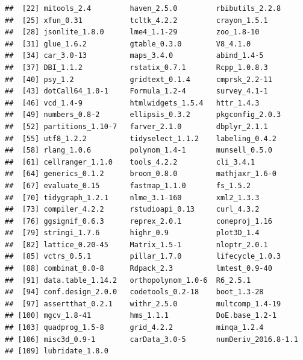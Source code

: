 \documentclass[11pt,a4paper,twoside]{book}\usepackage[]{graphicx}\usepackage[]{xcolor}
\makeatletter
\newenvironment{kframe}{%
 \def\at@end@of@kframe{}%
 \ifinner\ifhmode%
  \def\at@end@of@kframe{\end{minipage}}%
  \begin{minipage}{\columnwidth}%
 \fi\fi%
 \def\FrameCommand##1{\hskip\@totalleftmargin \hskip-\fboxsep
 \colorbox{shadecolor}{##1}\hskip-\fboxsep
     \hskip-\linewidth \hskip-\@totalleftmargin \hskip\columnwidth}%
 \MakeFramed {\advance\hsize-\width
   \@totalleftmargin\z@ \linewidth\hsize
   \@setminipage}}%
 {\par\unskip\endMakeFramed%
 \at@end@of@kframe}
\newenvironment{knitrout}{}{} %
\makeatother
\begin{document}
\begin{knitrout}
\begin{kframe}
\begin{verbatim}
##  [22] mitools_2.4         haven_2.5.0         rbibutils_2.2.8    
##  [25] xfun_0.31           tcltk_4.2.2         crayon_1.5.1       
##  [28] jsonlite_1.8.0      lme4_1.1-29         zoo_1.8-10         
##  [31] glue_1.6.2          gtable_0.3.0        V8_4.1.0           
##  [34] car_3.0-13          maps_3.4.0          abind_1.4-5        
##  [37] DBI_1.1.2           rstatix_0.7.1       Rcpp_1.0.8.3       
##  [40] psy_1.2             gridtext_0.1.4      cmprsk_2.2-11      
##  [43] dotCall64_1.0-1     Formula_1.2-4       survey_4.1-1       
##  [46] vcd_1.4-9           htmlwidgets_1.5.4   httr_1.4.3         
##  [49] numbers_0.8-2       ellipsis_0.3.2      pkgconfig_2.0.3    
##  [52] partitions_1.10-7   farver_2.1.0        dbplyr_2.1.1       
##  [55] utf8_1.2.2          tidyselect_1.1.2    labeling_0.4.2     
##  [58] rlang_1.0.6         polynom_1.4-1       munsell_0.5.0      
##  [61] cellranger_1.1.0    tools_4.2.2         cli_3.4.1          
##  [64] generics_0.1.2      broom_0.8.0         mathjaxr_1.6-0     
##  [67] evaluate_0.15       fastmap_1.1.0       fs_1.5.2           
##  [70] tidygraph_1.2.1     nlme_3.1-160        xml2_1.3.3         
##  [73] compiler_4.2.2      rstudioapi_0.13     curl_4.3.2         
##  [76] ggsignif_0.6.3      reprex_2.0.1        coneproj_1.16      
##  [79] stringi_1.7.6       highr_0.9           plot3D_1.4         
##  [82] lattice_0.20-45     Matrix_1.5-1        nloptr_2.0.1       
##  [85] vctrs_0.5.1         pillar_1.7.0        lifecycle_1.0.3    
##  [88] combinat_0.0-8      Rdpack_2.3          lmtest_0.9-40      
##  [91] data.table_1.14.2   orthopolynom_1.0-6  R6_2.5.1           
##  [94] conf.design_2.0.0   codetools_0.2-18    boot_1.3-28        
##  [97] assertthat_0.2.1    withr_2.5.0         multcomp_1.4-19    
## [100] mgcv_1.8-41         hms_1.1.1           DoE.base_1.2-1     
## [103] quadprog_1.5-8      grid_4.2.2          minqa_1.2.4        
## [106] misc3d_0.9-1        carData_3.0-5       numDeriv_2016.8-1.1
## [109] lubridate_1.8.0
\end{verbatim}
\end{kframe}
\end{knitrout}





\cleardoublepage
{}
{}


 


\cleardoublepage
\end{document}
